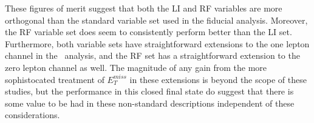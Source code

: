 \begin{comment}
A summary of performance metrics in this document may be found in Table \ref{tab:kahuna}.  


\begin{table}[!htbp]
\begin{center}
\begin{tabular}{lccc}
\hline\hline
 & Standard &LI &RF\\
\hline
$\hat{\mu}$ & $1.75^{+0.24}_{-0.23}(\textrm{stat.})^{+0.34}_{-0.28}(\textrm{syst.})$ & $1.65^{+0.24}_{-0.23}(\textrm{stat.})^{+0.34}_{-0.28}(\textrm{syst.})$ & $1.50^{+0.24}_{-0.23}(\textrm{stat.})^{+0.34}_{-0.28}(\textrm{syst.})$\\
Asi. $\Delta err\left(\mu\right)$ &  --- & $<1$\%, +4.6\% & -6.5\%, -2.2\%\\
Obs. $\Delta err\left(\hat{\mu}\right)$ &  --- & -7.5\%, -3.7\% & -16\%, -8.8\%\\
\hline
Stat only sig. & 4.78 & 4.39 (-7.9\%) & 4.44 (-6.9\%)\\
Exp. (Asi.) sig. & 2.06 & 1.92 (-6.7\%) & 2.13 (+3.5\%)\\
Exp. (data) sig. & 1.76 & 1.73 (-1.7\%) & 1.80 (+3.4\%)\\
Obs. (data) sig. & 2.87 & 2.79 (-2.8\%) & 2.62 (-8.6\%)\\
\hline\hline
\end{tabular}
\end{center}
\caption{Summary of performance figures for the standard, LI, and RF variable sets.  In the case of the latter two, \% differences are given where relevant.  Differences in errors on $\mu$ are on full systematics and total error, respectively.}
\label{tab:kahuna}
\end{table}
\end{comment}

These figures of merit suggest that both the LI and RF variables are more orthogonal than the standard variable set used in the fiducial analysis.  Moreover, the RF variable set does seem to consistently perform better than the LI set.  Furthermore, both variable sets have straightforward extensions to the one lepton channel in the \vhbb\, analysis, and the RF set has a straightforward extension to the zero lepton channel as well.  The magnitude of any gain from the more sophistocated treatment of $E_T^{miss}$ in these extensions is beyond the scope of these studies, but the performance in this closed final state do suggest that there is some value to be had in these non-standard descriptions independent of these considerations.

